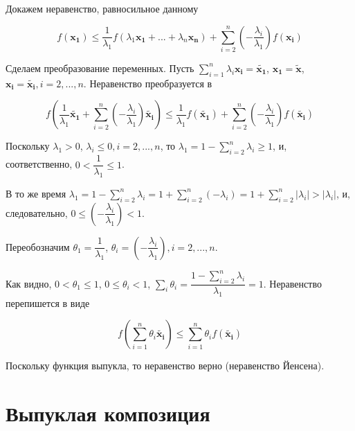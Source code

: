 	Докажем неравенство, равносильное данному
	
	\begin{equation}
	 f(\mathbf{x_1})  \leqslant \frac{1}{\lambda_1}f(\lambda_1 \mathbf{x_1} + ...+\lambda_n\mathbf{x_n})  + \sum\limits_{i=2}^{n} (-\frac{\lambda_i}{\lambda_1} )  f(\mathbf{x_i})
	\end{equation}
	
	Сделаем преобразование переменных. Пусть $\sum\limits_{i=1}^{n} \lambda_i \mathbf{x_i} = \mathbf{\tilde{x_1}}$, $\mathbf{x_1} = \mathbf{\tilde{x}}$, $\mathbf{x_i} = \mathbf{\tilde{x_i}}, i=2,...,n$. Неравенство преобразуется в
	
	\begin{equation}
	f(\frac{1}{\lambda_1}\mathbf{\tilde{x_1}}  + \sum\limits_{i=2}^{n} (-\frac{\lambda_i}{\lambda_1} )  \mathbf{\tilde{x_i}})  \leqslant \frac{1}{\lambda_1}f(\mathbf{\tilde{x_1}})  + \sum\limits_{i=2}^{n} (-\frac{\lambda_i}{\lambda_1} )  f(\mathbf{\tilde{x_i}})
	\end{equation}
	
	Поскольку $\lambda_1 > 0$, $\lambda_i \leqslant 0, i=2,...,n$, то $\lambda_1 = 1 - \sum\limits_{i=2}^{n}\lambda_i \geqslant 1$, и, соответственно, $0 < \dfrac{1}{\lambda_1} \leqslant 1$. 
	
	В то же время $\lambda_1 = 1 - \sum\limits_{i=2}^{n}\lambda_i = 1 + \sum\limits_{i=2}^{n}(-\lambda_i) = 1 + \sum\limits_{i=2}^{n}\left| \lambda_i\right| > \left| \lambda_i\right|$, и, следовательно, $0 \leqslant (-\dfrac{\lambda_i}{\lambda_1}) < 1$.
	
	Переобозначим $\theta_1 = \dfrac{1}{\lambda_1}$, $\theta_i = (-\dfrac{\lambda_i}{\lambda_1}), i=2,...,n$. 
	
	Как видно, $0<\theta_1 \leqslant 1$, $0 \leqslant \theta_i < 1$, $\sum\limits_i \theta_i = \dfrac{1 - \sum\limits_{i=2}^{n}\lambda_i}{\lambda_1}=1$. Неравенство перепишется в виде
	
	\begin{equation}
	f( \sum\limits_{i=1}^{n} \theta_i \mathbf{\tilde{x_i}})  \leqslant \sum\limits_{i=1}^{n} \theta_i  f(\mathbf{\tilde{x_i}})
	\end{equation}
	
	Поскольку функция выпукла, то неравенство верно (неравенство Йенсена).
	
	\section{Выпуклая композиция}

		

